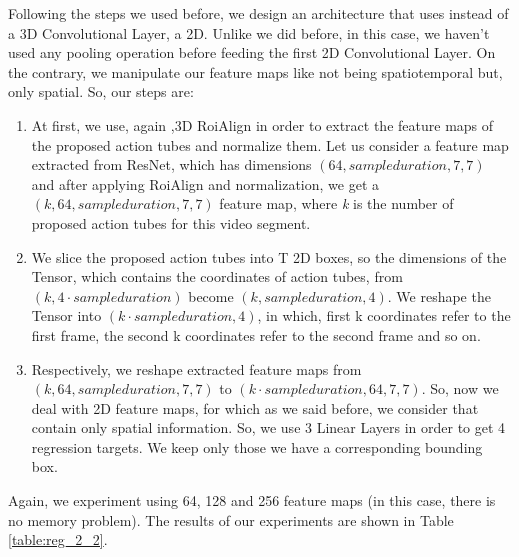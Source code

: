 Following the steps we used before, we design an architecture that uses instead of a 3D Convolutional Layer, a 2D. Unlike we did before, in this case, we haven't 
used any pooling operation before feeding the first 2D Convolutional Layer. On the contrary, we manipulate our feature maps like not being spatiotemporal but,
only spatial. So, our steps are:
\begin{enumerate}
\item At first, we use, again ,3D RoiAlign in order to extract the feature maps of the proposed action tubes and normalize them. Let us consider a feature map
  extracted from ResNet, which has dimensions $(64,sample duration,7,7)$ and after applying RoiAlign and normalization, we get a $(k,64,sample duration,7,7)$ feature map,
  where \textit{k} is the number of proposed  action tubes for this video segment.
\item We slice the proposed action tubes into T 2D boxes, so the dimensions of the Tensor, which contains the coordinates of action tubes, from $(k,4\cdot sample duration)$
  become $(k,sample duration, 4)$. We reshape the Tensor into $(k\cdot sample duration, 4)$, in which, first k coordinates refer to the first frame, the
  second k coordinates refer to the second frame and so on.
\item Respectively, we reshape extracted feature maps from $(k, 64, sample duration, 7, 7)$ to $(k\cdot sample duration, 64, 7, 7)$. So, now we deal with 2D feature maps, for which as we said before,
  we consider that contain only spatial information. So, we use 3 Linear Layers in order to get 4 regression targets. We keep only those we have a corresponding bounding
  box.
\end{enumerate}

Again, we experiment using 64, 128 and 256 feature maps (in this case, there is no memory problem). The results of our experiments are shown in Table \ref{table:reg_2_2}.

